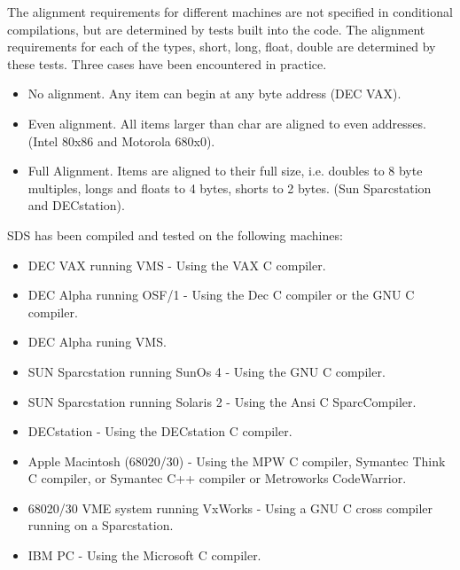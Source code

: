 The alignment requirements for different machines are not specified in
conditional compilations, but are determined by tests built into the code.
The alignment requirements for each of the types, short, long, float, double
are determined by these tests. Three cases have been encountered in practice.

\begin{itemize}

\item No alignment. Any item can begin at any byte address (DEC
VAX).

\item Even alignment. All items larger than char are aligned to even addresses.
(Intel 80x86 and Motorola 680x0).

\item Full Alignment. Items are aligned to their full size, i.e. doubles to 8
byte multiples, longs and floats to 4 bytes, shorts to 2 bytes. (Sun
Sparcstation and DECstation).

\end{itemize}

SDS has been compiled and tested on the following machines:

\begin{itemize}

\item DEC VAX running VMS - Using the VAX C compiler.

\item DEC Alpha running OSF/1 - Using the Dec C compiler or the GNU C compiler.

\item DEC Alpha runing VMS.

\item SUN Sparcstation running SunOs 4 - Using the GNU C compiler.

\item SUN Sparcstation running Solaris 2 - Using the Ansi C SparcCompiler. 

\item DECstation - Using the DECstation C compiler.

\item Apple Macintosh (68020/30) - Using the MPW C compiler, Symantec Think C
compiler, or Symantec C++ compiler or Metroworks CodeWarrior.

\item 68020/30 VME system running VxWorks - Using a GNU C cross compiler running
on a Sparcstation.

\item IBM PC - Using the Microsoft C compiler.

\end{itemize}

